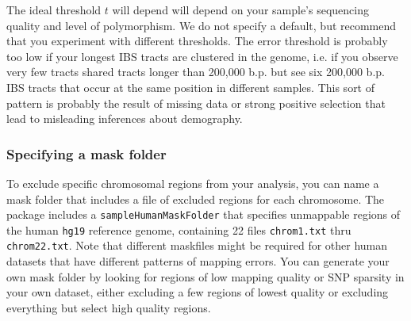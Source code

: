 \documentclass[12pt]{article}
\begin{document}
The ideal threshold $t$ will depend will depend on your sample's sequencing quality and level of polymorphism. We do not specify a default, but recommend that you experiment with different thresholds. The error threshold is probably too low if your longest IBS tracts are clustered in the genome, i.e. if you observe very few tracts shared tracts longer than 200,000 b.p. but see six 200,000 b.p. IBS tracts that occur at the same position in different samples. This sort of pattern is probably the result of missing data or strong positive selection that lead to misleading inferences about demography.

\subsubsection{Specifying a mask folder}
To exclude specific chromosomal regions from your analysis, you can name a mask folder that includes a file of excluded regions for each chromosome. The package includes a \texttt{sampleHumanMaskFolder} that specifies unmappable regions of the human \texttt{hg19} reference genome, containing 22 files \texttt{chrom1.txt} thru \texttt{chrom22.txt}. Note that different maskfiles might be required for other human datasets that have different patterns of mapping errors. You can generate your own mask folder by looking for regions of low mapping quality or SNP sparsity in your own dataset, either excluding a few regions of lowest quality or excluding everything but select high quality regions.
\end{document}
